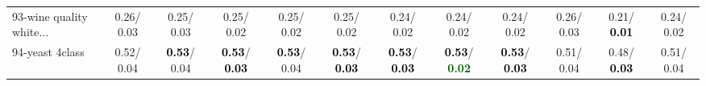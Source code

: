 \begin{table}[h]
\begin{center}
{\begin{tabular}{lc|c|c|c|c|c|c|c|c|c|c}
93-wine quality white... &   0.26/  0.03 &   0.25/  0.03 &   0.25/  0.02 &   0.25/  0.02 &   0.25/  0.02 &   0.24/  0.02 &   0.24/  0.02 &   0.24/  0.02 &   0.26/  0.03 &   0.21/\textcolor{black}{\textbf{  0.01}} &   0.24/  0.02 \\
94-yeast 4class &   0.52/  0.04 & \textcolor{black}{\textbf{  0.53}}/  0.04 & \textcolor{black}{\textbf{  0.53}}/\textcolor{black}{\textbf{  0.03}} & \textcolor{black}{\textbf{  0.53}}/  0.04 & \textcolor{black}{\textbf{  0.53}}/\textcolor{black}{\textbf{  0.03}} & \textcolor{black}{\textbf{  0.53}}/\textcolor{black}{\textbf{  0.03}} & \textcolor{black}{\textbf{  0.53}}/\textcolor{darkgreen}{\textbf{  0.02}} & \textcolor{black}{\textbf{  0.53}}/\textcolor{black}{\textbf{  0.03}} &   0.51/  0.04 &   0.48/\textcolor{black}{\textbf{  0.03}} &   0.51/  0.04 \\\end{tabular}
}\label{strats2aNB}
\end{center}
\end{table}
